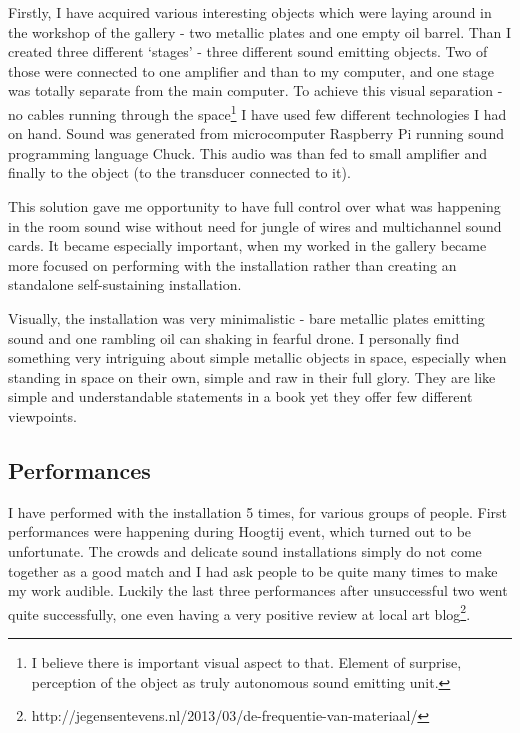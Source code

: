 \documentclass[12pt,a4paper,oneside]{report}
\begin{document}
Firstly, I have acquired various interesting objects which were laying around in the workshop of the gallery - two metallic plates and one empty oil barrel. Than I created three different `stages' - three different sound emitting objects. Two of those were connected to one amplifier and than to my computer, and one stage was totally separate from the main computer. To achieve this visual separation - no cables running through the space\footnote{I believe there is important visual aspect to that. Element of surprise, perception of the object as truly autonomous sound emitting unit.} I have used few different technologies I had on hand. Sound was generated from microcomputer Raspberry Pi running sound programming language Chuck. This audio was than fed to small amplifier and finally to the object (to the transducer connected to it).

This solution gave me opportunity to have full control over what was happening in the room sound wise without need for jungle of wires and multichannel sound cards. It became especially important, when my worked in the gallery became more focused on performing with the installation rather than creating an standalone self-sustaining installation.

Visually, the installation was very minimalistic - bare metallic plates emitting sound and one rambling oil can shaking in fearful drone. I personally find something very intriguing about simple metallic objects in space, especially when standing in space on their own, simple and raw in their full glory. They are like simple and understandable statements in a book yet they offer few different viewpoints.

\subsection{Performances}

I have performed with the installation 5 times, for various groups of people. First performances were happening during Hoogtij event, which turned out to be unfortunate. The crowds and delicate sound installations simply do not come together as a good match and I had ask people to be quite many times to make my work audible. Luckily the last three performances after unsuccessful two went quite successfully, one even having a very positive review at local art blog\footnote{http://jegensentevens.nl/2013/03/de-frequentie-van-materiaal/}.
\end{document}
